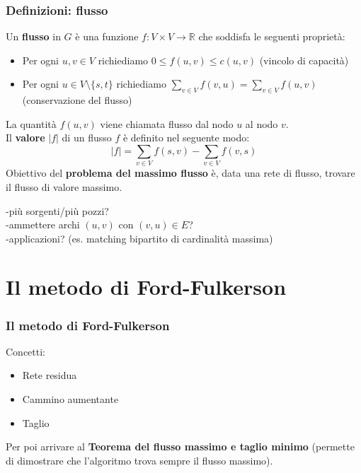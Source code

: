 \documentclass{beamer}
\begin{document}
\begin{frame}
\frametitle{Definizioni: flusso}
Un \textbf{flusso} in $G$ è una funzione $f:V\times V\rightarrow \mathbb{R}$ che soddisfa le seguenti proprietà:
\begin{itemize}
\item Per ogni $u,v\in V$ richiediamo $0\leq f(u,v)\leq c(u,v)$ (vincolo di capacità)
\item Per ogni $u\in V\setminus\{s,t\}$ richiediamo $\sum\limits_{v\in V}f(v,u)=\sum\limits_{v\in V}f(u,v)$ (conservazione del flusso)
\end{itemize}
La quantità $f(u,v)$ viene chiamata flusso dal nodo $u$ al nodo $v$.\\
Il \textbf{valore} $|f|$ di un flusso $f$ è definito nel seguente modo:\\
$$|f|=\sum\limits_{v\in V}f(s,v)-\sum\limits_{v\in V}f(v,s)$$
Obiettivo del \textbf{problema del massimo flusso} è, data una rete di flusso, trovare il flusso di valore massimo.
\end{frame}

\begin{frame}
-più sorgenti/più pozzi?\\
-ammettere archi $(u,v)$ con $(v,u)\in E$?\\
-applicazioni? (es. matching bipartito di cardinalità massima)
\end{frame}

\section{Il metodo di Ford-Fulkerson}

\begin{frame}
\frametitle{Il metodo di Ford-Fulkerson}
Concetti:
\begin{itemize}
\item Rete residua
\item Cammino aumentante
\item Taglio
\end{itemize}
Per poi arrivare al \textbf{Teorema del flusso massimo e taglio minimo} (permette di dimostrare che l'algoritmo trova sempre il flusso massimo).
\end{frame}
\end{document}
